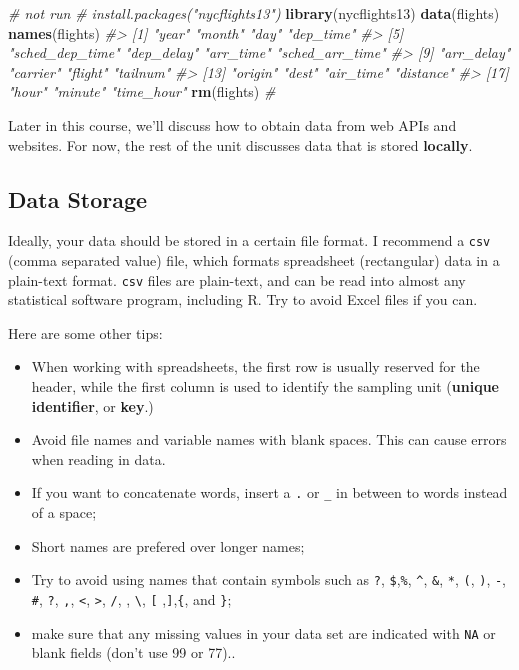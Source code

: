\documentclass[]{book}
\newenvironment{Shaded}{\begin{snugshade}}{\end{snugshade}}
\newcommand{\KeywordTok}[1]{\textcolor[rgb]{0.13,0.29,0.53}{\textbf{#1}}}
\newcommand{\CommentTok}[1]{\textcolor[rgb]{0.56,0.35,0.01}{\textit{#1}}}
\newcommand{\NormalTok}[1]{#1}
\providecommand{\tightlist}{%
  \setlength{\itemsep}{0pt}\setlength{\parskip}{0pt}}
\begin{document}
\begin{Shaded}
\begin{Highlighting}[]
\CommentTok{# not run}
\CommentTok{# install.packages("nycflights13")}
\KeywordTok{library}\NormalTok{(nycflights13)}
\KeywordTok{data}\NormalTok{(flights)}
\KeywordTok{names}\NormalTok{(flights)}
\CommentTok{#>  [1] "year"           "month"          "day"            "dep_time"      }
\CommentTok{#>  [5] "sched_dep_time" "dep_delay"      "arr_time"       "sched_arr_time"}
\CommentTok{#>  [9] "arr_delay"      "carrier"        "flight"         "tailnum"       }
\CommentTok{#> [13] "origin"         "dest"           "air_time"       "distance"      }
\CommentTok{#> [17] "hour"           "minute"         "time_hour"}
\KeywordTok{rm}\NormalTok{(flights)}
\CommentTok{# }
\end{Highlighting}
\end{Shaded}

Later in this course, we'll discuss how to obtain data from web APIs and
websites. For now, the rest of the unit discusses data that is stored
\textbf{locally}.

\subsection{Data Storage}\label{data-storage}

Ideally, your data should be stored in a certain file format. I
recommend a \texttt{csv} (comma separated value) file, which formats
spreadsheet (rectangular) data in a plain-text format. \texttt{csv}
files are plain-text, and can be read into almost any statistical
software program, including R. Try to avoid Excel files if you can.

Here are some other tips:

\begin{itemize}
\tightlist
\item
  When working with spreadsheets, the first row is usually reserved for
  the header, while the first column is used to identify the sampling
  unit (\textbf{unique identifier}, or \textbf{key}.)
\item
  Avoid file names and variable names with blank spaces. This can cause
  errors when reading in data.
\item
  If you want to concatenate words, insert a \texttt{.} or \texttt{\_}
  in between to words instead of a space;
\item
  Short names are prefered over longer names;
\item
  Try to avoid using names that contain symbols such as \texttt{?},
  \texttt{\$},\texttt{\%}, \texttt{\^{}}, \texttt{\&}, \texttt{*},
  \texttt{(}, \texttt{)}, \texttt{-}, \texttt{\#}, \texttt{?},
  \texttt{,}, \texttt{\textless{}}, \texttt{\textgreater{}}, \texttt{/},
  \texttt{\textbar{}}, \texttt{\textbackslash{}}, \texttt{{[}}
  ,\texttt{{]}},\texttt{\{}, and \texttt{\}};
\item
  make sure that any missing values in your data set are indicated with
  \texttt{NA} or blank fields (don't use 99 or 77)..
\end{itemize}
\end{document}
